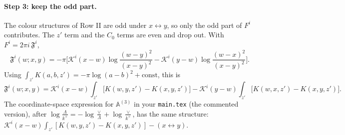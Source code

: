\documentclass[10pt]{article}
\numberwithin{equation}{section}
\newcommand{\KK}{\mathcal K}
\begin{document}
\paragraph{Step 3: keep the odd part.} The colour structures of Row II are odd under $x\leftrightarrow y$, so only the odd part of $F^i$ contributes. The $z'$ term and the $C_0$ terms are even and drop out. With $F^i=2\pi i\,\mathfrak F^i$,
\begin{equation}
\mathfrak F^i(w;x,y)=-\pi\Big[\KK^i(x-w)\log\frac{(w-y)^2}{(x-y)^2}-\KK^i(y-w)\log\frac{(w-x)^2}{(x-y)^2}\Big].
\end{equation}
Using $\int_{z'}K(a,b,z')=-\pi\log(a-b)^2+\text{const}$, this is
\begin{equation}
\mathfrak F^i(w;x,y)=\KK^i(x-w)\int_{z'}\big[K(w,y,z')-K(x,y,z')\big]-\KK^i(y-w)\int_{z'}\big[K(w,x,z')-K(x,y,z')\big].
\end{equation}
The coordinate-space expression for $\mathbb A^{(3)}$ in your \texttt{main.tex} (the commented version), after $\log\frac{\Lambda}{k^+}=-\log\frac{\vee}{\Lambda}+\log\frac{\vee}{k^+}$, has the same structure: $\KK^i(x-w)\int_{z'}[K(w,y,z')-K(x,y,z')]-(x\leftrightarrow y)$.
\end{document}
